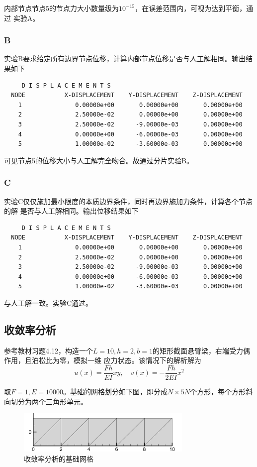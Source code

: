 \documentclass[12pt,a4paper]{article}
\begin{document}
内部节点节点5的节点力大小数量级为$10^{-15}$，在误差范围内，可视为达到平衡，通过
实验A。

\subsubsection{B}
实验B要求给定所有边界节点位移，计算内部节点位移是否与人工解相同。输出结果如下
\begin{verbatim}
     D I S P L A C E M E N T S
  NODE           X-DISPLACEMENT    Y-DISPLACEMENT    Z-DISPLACEMENT
    1               0.00000e+00       0.00000e+00       0.00000e+00
    2               2.50000e-02       0.00000e+00       0.00000e+00
    3               2.50000e-02      -9.00000e-03       0.00000e+00
    4               0.00000e+00      -6.00000e-03       0.00000e+00
    5               1.00000e-02      -3.60000e-03       0.00000e+00
\end{verbatim}

可见节点5的位移大小与人工解完全吻合。故通过分片实验B。

\subsubsection{C}
实验C仅仅施加最小限度的本质边界条件，同时再边界施加力条件，计算各个节点的解
是否与人工解相同。输出位移结果如下
\begin{verbatim}
     D I S P L A C E M E N T S
  NODE           X-DISPLACEMENT    Y-DISPLACEMENT    Z-DISPLACEMENT
    1               0.00000e+00       0.00000e+00       0.00000e+00
    2               2.50000e-02       0.00000e+00       0.00000e+00
    3               2.50000e-02      -9.00000e-03       0.00000e+00
    4               0.00000e+00      -6.00000e-03       0.00000e+00
    5               1.00000e-02      -3.60000e-03       0.00000e+00
\end{verbatim}

与人工解一致。实验C通过。

\subsection{收敛率分析}
参考教材习题4.12\cite{zhang2003}，构造一个$L=10, h=2, b=1$的矩形截面悬臂梁，右端受力偶作用，且泊松比为零，模拟一维
应力状态。该情况下的解析解为
\begin{equation}
    u(x) = \frac{Fh}{EI}xy, \quad v(x) = -\frac{Fh}{2EI}x^2
\end{equation}

取$F=1, E=10000$。基础的网格划分如下图，即分成$N\times5N$个方形，每个方形斜向切分为两个三角形单元。
\begin{figure}[H]
    \centering
    \includegraphics[width=0.75\textwidth]{mesh_1.png}
    \caption{收敛率分析的基础网格}
\end{figure}
\end{document}
